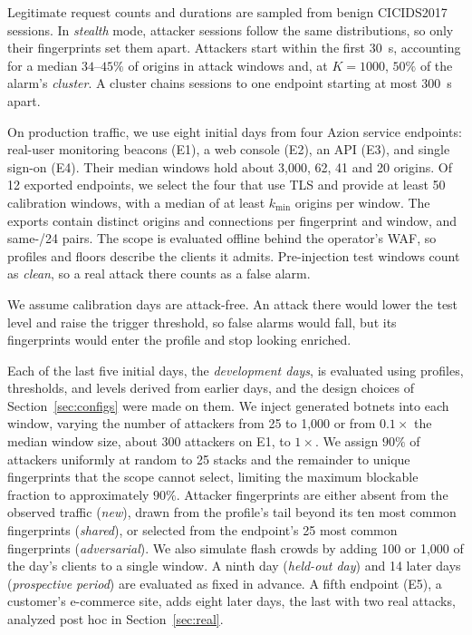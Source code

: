 \documentclass[conference,letterpaper,10pt]{IEEEtran}
\newcommand\1{\textit{(i)}}
\newcommand\2{\textit{(ii)}}
\newcommand\3{\textit{(iii)}}
\newcommand\4{\textit{(iv)}}
\newcommand\5{\textit{(v)}}
\newcommand\6{\textit{(vi)}}
\newcommand\7{\textit{(vii)}}
\newcommand\8{\textit{(viii)}}
\newcommand\9{\textit{(ix)}}
\begin{document}
Legitimate request counts and durations are sampled from benign CICIDS2017 sessions.  In \textit{stealth} mode, attacker sessions follow the same distributions, so only their fingerprints set them apart. Attackers start within the first 30~s, accounting for a median $34$--$45\%$ of origins in attack windows and, at $K=1000$, $50\%$ of the alarm's \textit{cluster}. A cluster chains sessions to one endpoint starting at most 300~s apart.

On production traffic, we use eight initial days from four Azion service endpoints: real-user monitoring beacons (E1), a web console (E2), an API (E3), and single sign-on (E4). Their median windows hold about 3,000, 62, 41 and 20 origins. Of 12 exported endpoints, we select the four that use TLS and provide at least 50 calibration windows, with a median of at least $k_{\min}$ origins per window. The exports contain distinct origins and connections per fingerprint and window, and same-/24 pairs. The scope is evaluated offline behind the operator's WAF, so profiles and floors describe the clients it admits. Pre-injection test windows count as \textit{clean}, so a real attack there counts as a false alarm.

We assume calibration days are attack-free. An attack there would lower the test level and raise the trigger threshold, so false alarms would fall, but its fingerprints would enter the profile and stop looking enriched.

Each of the last five initial days, the \textit{development days}, is evaluated using profiles, thresholds, and levels derived from earlier days, and the design choices of Section~\ref{sec:configs} were made on them. We inject generated botnets into each window, varying the number of attackers from 25 to 1,000 or from $0.1\times$ the median window size, about 300 attackers on E1, to $1\times$. We assign $90\%$ of attackers uniformly at random to 25 stacks and the remainder to unique fingerprints that the scope cannot select, limiting the maximum blockable fraction to approximately $90\%$. Attacker fingerprints are either absent from the observed traffic (\textit{new}), drawn from the profile's tail beyond its ten most common fingerprints (\textit{shared}), or selected from the endpoint's 25 most common fingerprints (\textit{adversarial}). We also simulate flash crowds by adding 100 or 1,000 of the day's clients to a single window. A ninth day (\textit{held-out day}) and 14 later days (\textit{prospective period}) are evaluated as fixed in advance. A fifth endpoint (E5), a customer's e-commerce site, adds eight later days, the last with two real attacks, analyzed post hoc in Section~\ref{sec:real}.
\end{document}
